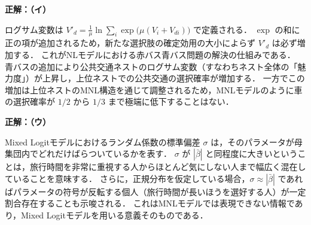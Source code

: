 \begin{example}[title={クイズ 2 正解・解説}]
\label{ans:ch2-q2}
\textbf{正解：（イ）}

ログサム変数は $V'_d = \frac{1}{\mu}\ln\sum_i \exp\bigl(\mu (V_i + V_{di})\bigr)$ で定義される．
$\exp$ の和に正の項が追加されるため，新たな選択肢の確定効用の大小によらず $V'_d$ は必ず増加する．
これがNLモデルにおける赤バス青バス問題の解決の仕組みである．
青バスの追加により公共交通ネストのログサム変数（すなわちネスト全体の「魅力度」）が上昇し，上位ネストでの公共交通の選択確率が増加する．
一方でこの増加は上位ネストのMNL構造を通じて調整されるため，MNLモデルのように車の選択確率が $1/2$ から $1/3$ まで極端に低下することはない．
\end{example}

\begin{example}[title={クイズ 3 正解・解説}]
\label{ans:ch2-q3}
\textbf{正解：（ウ）}

Mixed Logitモデルにおけるランダム係数の標準偏差 $\sigma$ は，そのパラメータが母集団内でどれだけばらついているかを表す．
$\sigma$ が $|\bar{\beta}|$ と同程度に大きいということは，旅行時間を非常に重視する人からほとんど気にしない人まで幅広く混在していることを意味する．
さらに，正規分布を仮定している場合，$\sigma \approx |\bar{\beta}|$ であればパラメータの符号が反転する個人（旅行時間が長いほうを選好する人）が一定割合存在することも示唆される．
これはMNLモデルでは表現できない情報であり，Mixed Logitモデルを用いる意義そのものである．
\end{example}



